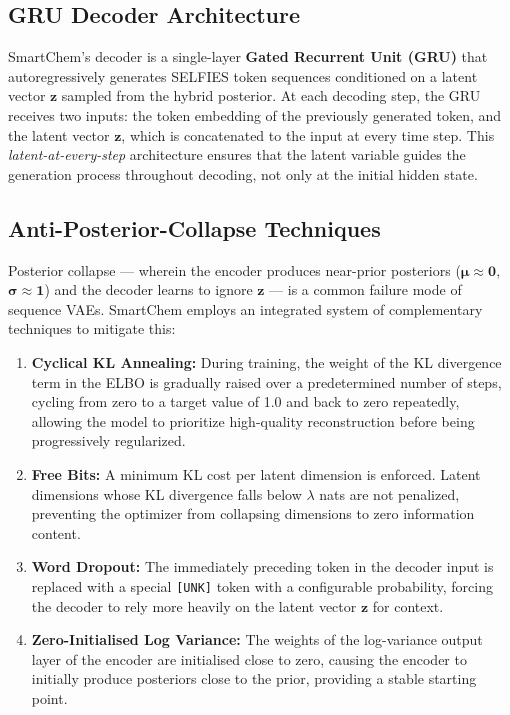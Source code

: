 \documentclass[12pt,a4paper]{report}
\begin{document}
\subsection{GRU Decoder Architecture}

SmartChem's decoder is a single-layer \textbf{Gated Recurrent Unit (GRU)} that autoregressively generates SELFIES token sequences conditioned on a latent vector $\mathbf{z}$ sampled from the hybrid posterior. At each decoding step, the GRU receives two inputs: the token embedding of the previously generated token, and the latent vector $\mathbf{z}$, which is concatenated to the input at every time step. This \textit{latent-at-every-step} architecture ensures that the latent variable guides the generation process throughout decoding, not only at the initial hidden state.

\subsection{Anti-Posterior-Collapse Techniques}

Posterior collapse — wherein the encoder produces near-prior posteriors ($\boldsymbol{\mu} \approx \mathbf{0}$, $\boldsymbol{\sigma} \approx \mathbf{1}$) and the decoder learns to ignore $\mathbf{z}$ — is a common failure mode of sequence VAEs. SmartChem employs an integrated system of complementary techniques to mitigate this:
\begin{enumerate}
    \item \textbf{Cyclical KL Annealing:} During training, the weight of the KL divergence term in the ELBO is gradually raised over a predetermined number of steps, cycling from zero to a target value of 1.0 and back to zero repeatedly, allowing the model to prioritize high-quality reconstruction before being progressively regularized.
    \item \textbf{Free Bits:} A minimum KL cost per latent dimension is enforced. Latent dimensions whose KL divergence falls below $\lambda$ nats are not penalized, preventing the optimizer from collapsing dimensions to zero information content.
    \item \textbf{Word Dropout:} The immediately preceding token in the decoder input is replaced with a special \texttt{[UNK]} token with a configurable probability, forcing the decoder to rely more heavily on the latent vector $\mathbf{z}$ for context.
    \item \textbf{Zero-Initialised Log Variance:} The weights of the log-variance output layer of the encoder are initialised close to zero, causing the encoder to initially produce posteriors close to the prior, providing a stable starting point.
\end{enumerate}
\end{document}
